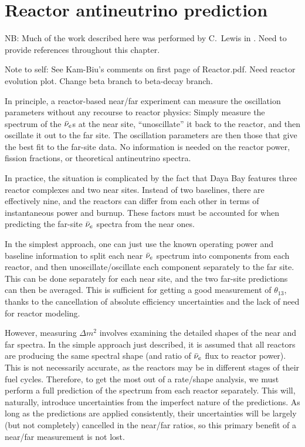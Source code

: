 \documentclass[../thesis.tex]{subfiles}
\begin{document}
\chapter{Reactor antineutrino prediction}
\label{chap:reactor}

NB: Much of the work described here was performed by C.~Lewis in \cite{Lewis}. Need to provide references throughout this chapter.

Note to self: See Kam-Biu's comments on first page of Reactor.pdf. Need reactor evolution plot. Change beta branch to beta-decay branch.

In principle, a reactor-based near/far experiment can measure the oscillation parameters without any recourse to reactor physics: Simply measure the spectrum of the $\bar\nu_e$s at the near site, ``unoscillate'' it back to the reactor, and then oscillate it out to the far site. The oscillation parameters are then those that give the best fit to the far-site data. No information is needed on the reactor power, fission fractions, or theoretical antineutrino spectra.

In practice, the situation is complicated by the fact that Daya Bay features three reactor complexes and two near sites. Instead of two baselines, there are effectively nine, and the reactors can differ from each other in terms of instantaneous power and burnup. These factors must be accounted for when predicting the far-site $\bar\nu_e$ spectra from the near ones.

In the simplest approach, one can just use the known operating power and baseline information to split each near $\bar\nu_e$ spectrum into components from each reactor, and then unoscillate/oscillate each component separately to the far site. This can be done separately for each near site, and the two far-site predictions can then be averaged. This is sufficient for getting a good measurement of $\theta_{13}$, thanks to the cancellation of absolute efficiency uncertainties and the lack of need for reactor modeling.

However, measuring $\Delta m^2$ involves examining the detailed shapes of the near and far spectra. In the simple approach just described, it is assumed that all reactors are producing the same spectral shape (and ratio of $\bar\nu_e$ flux to reactor power). This is not necessarily accurate, as the reactors may be in different stages of their fuel cycles. Therefore, to get the most out of a rate/shape analysis, we must perform a full prediction of the spectrum from each reactor separately. This will, naturally, introduce uncertainties from the imperfect nature of the predictions. As long as the predictions are applied consistently, their uncertainties will be largely (but not completely) cancelled in the near/far ratios, so this primary benefit of a near/far measurement is not lost.
\end{document}
